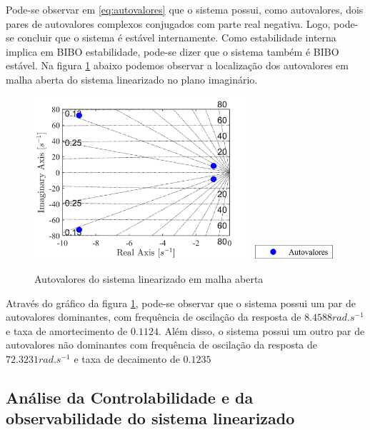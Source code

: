 \documentclass[a4paper]{ifacconf}
\begin{document}
    Pode-se observar em \ref {eq:autovalores} que o sistema possui, como autovalores, dois pares de autovalores complexos conjugados com parte real negativa. Logo, pode-se concluir que o sistema é estável internamente. Como estabilidade interna implica em BIBO estabilidade, pode-se dizer que o sistema também é BIBO estável.
    Na figura \ref{fig:autovalores_malha_aberta} abaixo podemos observar a localização dos autovalores em malha aberta do sistema linearizado no plano imaginário.
    
    \FloatBarrier
    \begin{figure}[htbp]
        \begin{centering}
            \includegraphics[width=8cm]{img/autovalores_malha_aberta.png}
            \includegraphics[width=3cm]{img/autovalores_malha_aberta_leg.png}
            \caption{Autovalores do sistema linearizado em malha aberta}
            \label{fig:autovalores_malha_aberta}
        \end{centering}
    \end{figure}
    \FloatBarrier
    
    Através do gráfico da figura \ref{fig:autovalores_malha_aberta}, pode-se observar que o sistema possui um par de autovalores dominantes, com frequência de oscilação da resposta de $8.4588 rad.s^{-1}$ e taxa de amortecimento de $0.1124$. Além disso, o sistema possui um outro par de autovalores não dominantes com frequência de oscilação da resposta de $72.3231 rad.s^{-1}$ e taxa de decaimento de $0.1235$
    
        \subsection{Análise da Controlabilidade e da observabilidade do sistema linearizado}
    
\end{document}
